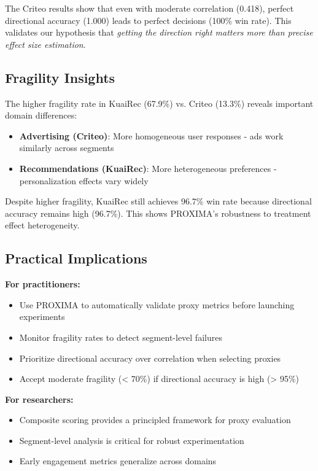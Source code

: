 \documentclass[11pt,twocolumn]{article}
\begin{document}
The Criteo results show that even with moderate correlation (0.418), perfect directional accuracy (1.000) leads to perfect decisions (100\% win rate). This validates our hypothesis that \textit{getting the direction right matters more than precise effect size estimation}.

\subsection{Fragility Insights}

The higher fragility rate in KuaiRec (67.9\%) vs. Criteo (13.3\%) reveals important domain differences:

\begin{itemize}
    \item \textbf{Advertising (Criteo)}: More homogeneous user responses - ads work similarly across segments
    \item \textbf{Recommendations (KuaiRec)}: More heterogeneous preferences - personalization effects vary widely
\end{itemize}

Despite higher fragility, KuaiRec still achieves 96.7\% win rate because directional accuracy remains high (96.7\%). This shows PROXIMA's robustness to treatment effect heterogeneity.

\subsection{Practical Implications}

\textbf{For practitioners:}
\begin{itemize}
    \item Use PROXIMA to automatically validate proxy metrics before launching experiments
    \item Monitor fragility rates to detect segment-level failures
    \item Prioritize directional accuracy over correlation when selecting proxies
    \item Accept moderate fragility (< 70\%) if directional accuracy is high (> 95\%)
\end{itemize}

\textbf{For researchers:}
\begin{itemize}
    \item Composite scoring provides a principled framework for proxy evaluation
    \item Segment-level analysis is critical for robust experimentation
    \item Early engagement metrics generalize across domains
\end{itemize}
\end{document}
